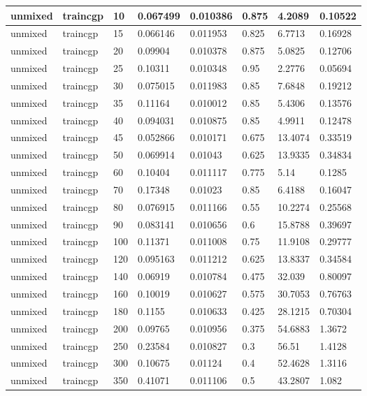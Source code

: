 \begin{longtable}{llllllll}
unmixed & traincgp & 10 & 0.067499 & 0.010386 & 0.875 & 4.2089 & 0.10522 \\ \hline 
unmixed & traincgp & 15 & 0.066146 & 0.011953 & 0.825 & 6.7713 & 0.16928 \\ \hline 
unmixed & traincgp & 20 & 0.09904 & 0.010378 & 0.875 & 5.0825 & 0.12706 \\ \hline 
unmixed & traincgp & 25 & 0.10311 & 0.010348 & 0.95 & 2.2776 & 0.05694 \\ \hline 
unmixed & traincgp & 30 & 0.075015 & 0.011983 & 0.85 & 7.6848 & 0.19212 \\ \hline 
unmixed & traincgp & 35 & 0.11164 & 0.010012 & 0.85 & 5.4306 & 0.13576 \\ \hline 
unmixed & traincgp & 40 & 0.094031 & 0.010875 & 0.85 & 4.9911 & 0.12478 \\ \hline 
unmixed & traincgp & 45 & 0.052866 & 0.010171 & 0.675 & 13.4074 & 0.33519 \\ \hline 
unmixed & traincgp & 50 & 0.069914 & 0.01043 & 0.625 & 13.9335 & 0.34834 \\ \hline 
unmixed & traincgp & 60 & 0.10404 & 0.011117 & 0.775 & 5.14 & 0.1285 \\ \hline 
unmixed & traincgp & 70 & 0.17348 & 0.01023 & 0.85 & 6.4188 & 0.16047 \\ \hline 
unmixed & traincgp & 80 & 0.076915 & 0.011166 & 0.55 & 10.2274 & 0.25568 \\ \hline 
unmixed & traincgp & 90 & 0.083141 & 0.010656 & 0.6 & 15.8788 & 0.39697 \\ \hline 
unmixed & traincgp & 100 & 0.11371 & 0.011008 & 0.75 & 11.9108 & 0.29777 \\ \hline 
unmixed & traincgp & 120 & 0.095163 & 0.011212 & 0.625 & 13.8337 & 0.34584 \\ \hline 
unmixed & traincgp & 140 & 0.06919 & 0.010784 & 0.475 & 32.039 & 0.80097 \\ \hline 
unmixed & traincgp & 160 & 0.10019 & 0.010627 & 0.575 & 30.7053 & 0.76763 \\ \hline 
unmixed & traincgp & 180 & 0.1155 & 0.010633 & 0.425 & 28.1215 & 0.70304 \\ \hline 
unmixed & traincgp & 200 & 0.09765 & 0.010956 & 0.375 & 54.6883 & 1.3672 \\ \hline 
unmixed & traincgp & 250 & 0.23584 & 0.010827 & 0.3 & 56.51 & 1.4128 \\ \hline 
unmixed & traincgp & 300 & 0.10675 & 0.01124 & 0.4 & 52.4628 & 1.3116 \\ \hline 
unmixed & traincgp & 350 & 0.41071 & 0.011106 & 0.5 & 43.2807 & 1.082 \\ \hline 

\end{longtable}
